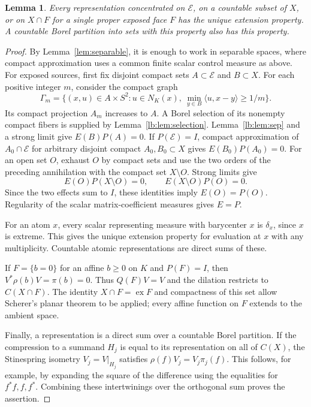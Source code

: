 \documentclass[11pt,letterpaper]{amsart}
\newtheorem{lemma}[theorem]{Lemma}
\theoremstyle{definition}
\theoremstyle{remark}
\numberwithin{equation}{section}
\DeclareMathOperator{\ex}{ex}
\begin{document}
\begin{lemma}\label{lem:good}
Every representation concentrated on $\mathcal E$, on a countable
subset of $X$, or on $X\cap F$ for a single proper exposed face $F$
has the unique extension property. A countable Borel partition into
sets with this property also has this property.
\end{lemma}
\begin{proof}
By Lemma~\ref{lem:separable}, it is enough to work in separable
spaces, where compact approximation uses a common finite scalar control
measure as above. For exposed sources, first fix disjoint compact sets $A\subset\mathcal E$
and $B\subset X$. For each positive integer $m$, consider the compact graph
\[
\Gamma_m=\{(x,u)\in A\times S^2:
 u\in N_K(x),\ \min_{y\in B}\langle u,x-y\rangle\ge1/m\}.
\]
Its compact projection $A_m$ increases to $A$. A Borel selection of its nonempty compact fibers is supplied by Lemma~\ref{lb:lem:selection}. Lemma~\ref{lb:lem:sep} and a strong limit give
$E(B)P(A)=0$.
If $P(\mathcal E)=I$, compact approximation of $A_0\cap\mathcal E$
for arbitrary disjoint compact $A_0,B_0\subset X$ gives
$E(B_0)P(A_0)=0$. For an open set $O$, exhaust $O$ by compact sets and use the two
orders of the preceding annihilation with the compact set $X\setminus O$.
Strong limits give
\[
 E(O)P(X\setminus O)=0,\qquad E(X\setminus O)P(O)=0.
\]
Since the two effects sum to $I$, these identities imply $E(O)=P(O)$.
Regularity of the scalar matrix-coefficient measures gives $E=P$.

For an atom $x$, every scalar representing measure with barycenter $x$
is $\delta_x$, since $x$ is extreme. This gives the unique extension
property for evaluation at $x$ with any multiplicity. Countable atomic
representations are direct sums of these.

If $F=\{b=0\}$ for an affine $b\ge0$ on $K$ and $P(F)=I$, then
$V^*\rho(b)V=\pi(b)=0$. Thus $Q(F)V=V$ and the dilation restricts to
$C(X\cap F)$. The identity $X\cap F=\ex F$ and compactness of this set
allow Scherer's planar theorem \cite[Theorem 3.8]{planar} to be applied; every affine function on $F$
extends to the ambient space.

Finally, a representation is a direct sum over a countable Borel
partition. If the compression to a summand $H_j$ is equal to its
representation on all of $C(X)$, the Stinespring isometry $V_j=V|_{H_j}$
satisfies $\rho(f)V_j=V_j\pi_j(f)$. This follows, for example, by
expanding the square of the difference using the equalities for
$f^*f,f,f^*$. Combining these intertwinings over the orthogonal sum
proves the assertion.
\end{proof}
\end{document}
